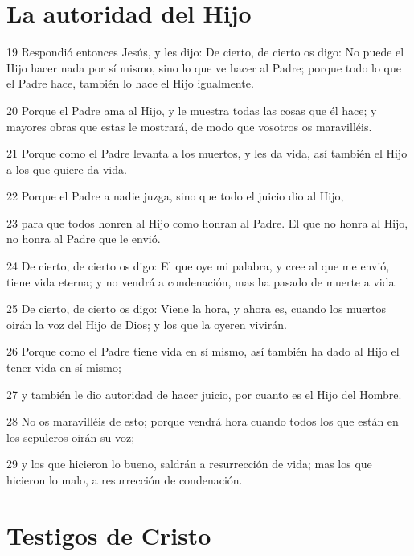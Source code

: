 \section*{La autoridad del Hijo}

\par 19 Respondió entonces Jesús, y les dijo: De cierto, de cierto os digo: No puede el Hijo hacer nada por sí mismo, sino lo que ve hacer al Padre; porque todo lo que el Padre hace, también lo hace el Hijo igualmente.
\par 20 Porque el Padre ama al Hijo, y le muestra todas las cosas que él hace; y mayores obras que estas le mostrará, de modo que vosotros os maravilléis.
\par 21 Porque como el Padre levanta a los muertos, y les da vida, así también el Hijo a los que quiere da vida.
\par 22 Porque el Padre a nadie juzga, sino que todo el juicio dio al Hijo,
\par 23 para que todos honren al Hijo como honran al Padre. El que no honra al Hijo, no honra al Padre que le envió.
\par 24 De cierto, de cierto os digo: El que oye mi palabra, y cree al que me envió, tiene vida eterna; y no vendrá a condenación, mas ha pasado de muerte a vida.
\par 25 De cierto, de cierto os digo: Viene la hora, y ahora es, cuando los muertos oirán la voz del Hijo de Dios; y los que la oyeren vivirán.
\par 26 Porque como el Padre tiene vida en sí mismo, así también ha dado al Hijo el tener vida en sí mismo;
\par 27 y también le dio autoridad de hacer juicio, por cuanto es el Hijo del Hombre.
\par 28 No os maravilléis de esto; porque vendrá hora cuando todos los que están en los sepulcros oirán su voz;
\par 29 y los que hicieron lo bueno, saldrán a resurrección de vida; mas los que hicieron lo malo, a resurrección de condenación.

\section*{Testigos de Cristo}

